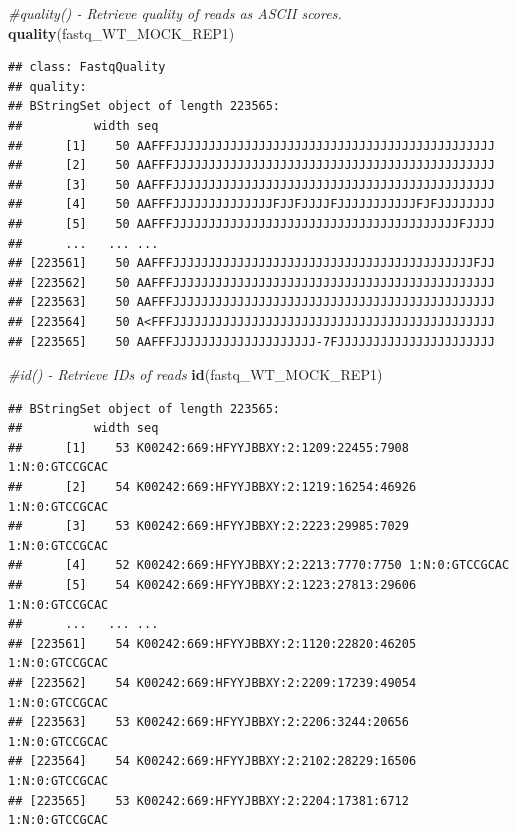 \documentclass[
]{book}
\newenvironment{Shaded}{\begin{snugshade}}{\end{snugshade}}
\newcommand{\CommentTok}[1]{\textcolor[rgb]{0.56,0.35,0.01}{\textit{#1}}}
\newcommand{\FunctionTok}[1]{\textcolor[rgb]{0.13,0.29,0.53}{\textbf{#1}}}
\newcommand{\NormalTok}[1]{#1}
\begin{document}
\begin{Shaded}
\begin{Highlighting}[]
\CommentTok{\#quality() {-} Retrieve quality of reads as ASCII scores.}
\FunctionTok{quality}\NormalTok{(fastq\_WT\_MOCK\_REP1)}
\end{Highlighting}
\end{Shaded}

\begin{verbatim}
## class: FastqQuality
## quality:
## BStringSet object of length 223565:
##          width seq
##      [1]    50 AAFFFJJJJJJJJJJJJJJJJJJJJJJJJJJJJJJJJJJJJJJJJJJJJJ
##      [2]    50 AAFFFJJJJJJJJJJJJJJJJJJJJJJJJJJJJJJJJJJJJJJJJJJJJJ
##      [3]    50 AAFFFJJJJJJJJJJJJJJJJJJJJJJJJJJJJJJJJJJJJJJJJJJJJJ
##      [4]    50 AAFFFJJJJJJJJJJJJJJFJJFJJJJFJJJJJJJJJJJFJFJJJJJJJJ
##      [5]    50 AAFFFJJJJJJJJJJJJJJJJJJJJJJJJJJJJJJJJJJJJJJJJFJJJJ
##      ...   ... ...
## [223561]    50 AAFFFJJJJJJJJJJJJJJJJJJJJJJJJJJJJJJJJJJJJJJJJJJFJJ
## [223562]    50 AAFFFJJJJJJJJJJJJJJJJJJJJJJJJJJJJJJJJJJJJJJJJJJJJJ
## [223563]    50 AAFFFJJJJJJJJJJJJJJJJJJJJJJJJJJJJJJJJJJJJJJJJJJJJJ
## [223564]    50 A<FFFJJJJJJJJJJJJJJJJJJJJJJJJJJJJJJJJJJJJJJJJJJJJJ
## [223565]    50 AAFFFJJJJJJJJJJJJJJJJJJJJ-7FJJJJJJJJJJJJJJJJJJJJJJ
\end{verbatim}

\begin{Shaded}
\begin{Highlighting}[]
\CommentTok{\#id() {-} Retrieve IDs of reads}
\FunctionTok{id}\NormalTok{(fastq\_WT\_MOCK\_REP1)}
\end{Highlighting}
\end{Shaded}

\begin{verbatim}
## BStringSet object of length 223565:
##          width seq
##      [1]    53 K00242:669:HFYYJBBXY:2:1209:22455:7908 1:N:0:GTCCGCAC
##      [2]    54 K00242:669:HFYYJBBXY:2:1219:16254:46926 1:N:0:GTCCGCAC
##      [3]    53 K00242:669:HFYYJBBXY:2:2223:29985:7029 1:N:0:GTCCGCAC
##      [4]    52 K00242:669:HFYYJBBXY:2:2213:7770:7750 1:N:0:GTCCGCAC
##      [5]    54 K00242:669:HFYYJBBXY:2:1223:27813:29606 1:N:0:GTCCGCAC
##      ...   ... ...
## [223561]    54 K00242:669:HFYYJBBXY:2:1120:22820:46205 1:N:0:GTCCGCAC
## [223562]    54 K00242:669:HFYYJBBXY:2:2209:17239:49054 1:N:0:GTCCGCAC
## [223563]    53 K00242:669:HFYYJBBXY:2:2206:3244:20656 1:N:0:GTCCGCAC
## [223564]    54 K00242:669:HFYYJBBXY:2:2102:28229:16506 1:N:0:GTCCGCAC
## [223565]    53 K00242:669:HFYYJBBXY:2:2204:17381:6712 1:N:0:GTCCGCAC
\end{verbatim}
\end{document}
